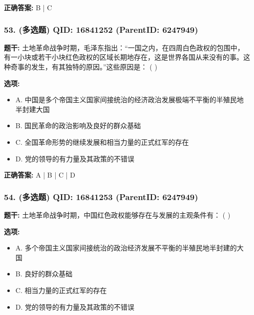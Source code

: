 \documentclass[12pt,UTF8]{ctexart}
\begin{document}
\textbf{正确答案:}
B | C

\vspace{0.3em}\hrulefill\vspace{0.7em}

\subsubsection*{53. (多选题) \small QID: 16841252 (ParentID: 6247949)}

\textbf{题干:}
土地革命战争时期，毛泽东指出：“一国之内，在四周白色政权的包围中，有一小块或若干小块红色政权的区域长期地存在，这是世界各国从来没有的事。这种奇事的发生，有其独特的原因。”这些原因是： ( )



\textbf{选项:}
\begin{itemize}[leftmargin=*]

  \item A. 中国是多个帝国主义国家间接统治的经济政治发展极端不平衡的半殖民地半封建大国

  \item B. 国民革命的政治影响及良好的群众基础

  \item C. 全国革命形势的继续发展和相当力量的正式红军的存在

  \item D. 党的领导的有力量及其政策的不错误

\end{itemize}

\textbf{正确答案:}
A | B | C | D

\vspace{0.3em}\hrulefill\vspace{0.7em}

\subsubsection*{54. (多选题) \small QID: 16841253 (ParentID: 6247949)}

\textbf{题干:}
土地革命战争时期，中国红色政权能够存在与发展的主观条件有： ( )



\textbf{选项:}
\begin{itemize}[leftmargin=*]

  \item A. 多个帝国主义国家间接统治的政治经济发展不平衡的半殖民地半封建的大国

  \item B. 良好的群众基础

  \item C. 相当力量的正式红军的存在

  \item D. 党的领导的有力量及其政策的不错误

\end{itemize}
\end{document}
